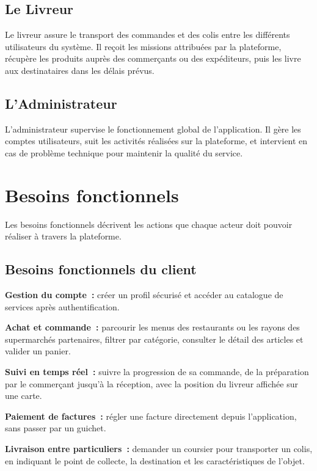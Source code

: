 \documentclass[12pt,fleqn,a4paper]{report}
\begin{document}
\begin{justify}
\subsection{Le Livreur}
Le livreur assure le transport des commandes et des colis entre les différents utilisateurs du système. Il reçoit les missions attribuées par la plateforme, récupère les produits auprès des commerçants ou des expéditeurs, puis les livre aux destinataires dans les délais prévus.

\subsection{L'Administrateur}
L'administrateur supervise le fonctionnement global de l'application. Il gère les comptes utilisateurs, suit les activités réalisées sur la plateforme, et intervient en cas de problème technique pour maintenir la qualité du service.

\section{Besoins fonctionnels}

Les besoins fonctionnels décrivent les actions que chaque acteur doit pouvoir réaliser à travers la plateforme.

\subsection{Besoins fonctionnels du client}

\textbf{Gestion du compte~:} créer un profil sécurisé et accéder au catalogue de services après authentification.

\vspace{0.3cm}
\textbf{Achat et commande~:} parcourir les menus des restaurants ou les rayons des supermarchés partenaires, filtrer par catégorie, consulter le détail des articles et valider un panier.

\vspace{0.3cm}
\textbf{Suivi en temps réel~:} suivre la progression de sa commande, de la préparation par le commerçant jusqu'à la réception, avec la position du livreur affichée sur une carte.

\vspace{0.3cm}
\textbf{Paiement de factures~:} régler une facture directement depuis l'application, sans passer par un guichet.

\vspace{0.3cm}
\textbf{Livraison entre particuliers~:} demander un coursier pour transporter un colis, en indiquant le point de collecte, la destination et les caractéristiques de l'objet.


\end{justify}
\end{document}
